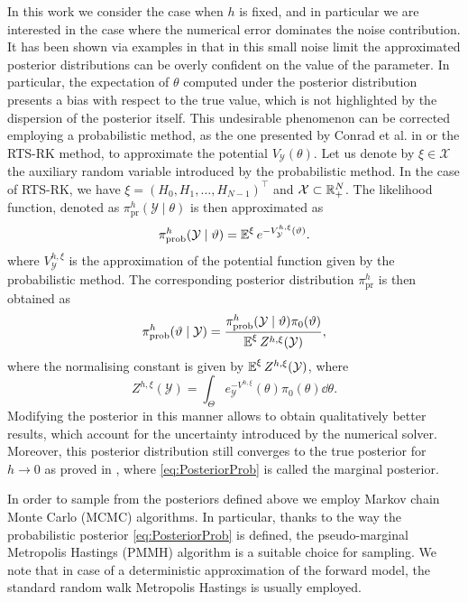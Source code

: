 \documentclass[10pt]{article}
\begin{document}
In this work we consider the case when $h$ is fixed, and in particular we are interested in the case where the numerical error dominates the noise contribution. It has been shown via examples in \cite{CGS16, COS17} that in this small noise limit the approximated posterior distributions can be overly confident on the value of the parameter. In particular, the expectation of $\theta$ computed under the posterior distribution presents a bias with respect to the true value, which is not highlighted by the dispersion of the posterior itself. This undesirable phenomenon can be corrected employing a probabilistic method, as the one presented by Conrad et al. in \cite{CGS16} or the RTS-RK method, to approximate the potential $V_\mathcal{Y}(\theta)$. Let us denote by $\xi \in \mathcal{X}$ the auxiliary random variable introduced by the probabilistic method. In the case of RTS-RK, we have $\xi = (H_0, H_1, \ldots, H_{N-1})^\top$ and $\mathcal{X} \subset \mathbb{R}_+^N$. The likelihood function, denoted as  $\pi^h_{\mathrm{pr}}(\mathcal{Y}\mid\theta)$ is then approximated as 
\begin{equation}\label{eq:LikelihoodProb}
	\pi^h_{\mathrm{prob}}(\mathcal{Y}\mid \vartheta) = \operatorname{\mathbb{E}}^\xi e^{-V^{h,\xi}_{\mathcal{Y}}(\vartheta)}.
\end{equation}
where $V^{h, \xi}_{\mathcal{Y}}$ is the approximation of the potential function given by the probabilistic method. The corresponding posterior distribution $\pi^h_{\mathrm{pr}}$ is then obtained as
\begin{equation}\label{eq:PosteriorProb}
	\pi^h_{\mathrm{prob}}(\vartheta\mid\mathcal{Y}) = \frac{\pi^h_{\mathrm{prob}}(\mathcal{Y}\mid \vartheta)\pi_0(\vartheta)}{\operatorname{\mathbb{E}}^\xi Z^{h, \xi}(\mathcal{Y})},
\end{equation}
where the normalising constant is given by $\operatorname{\mathbb{E}}^\xi Z^{h, \xi}(\mathcal{Y})$, where
\begin{equation}
	Z^{h, \xi}(\mathcal{Y}) = \int_{\Theta} e^{-V^{h,\xi}}_{\mathcal{Y}}(\theta) \pi_0(\theta) \dd \theta.
\end{equation}
Modifying the posterior in this manner allows to obtain qualitatively better results, which account for the uncertainty introduced by the numerical solver. Moreover, this posterior distribution still converges to the true posterior for $h \to 0$ as proved in \cite{LST17}, where \eqref{eq:PosteriorProb} is called the marginal posterior.

In order to sample from the posteriors defined above we employ Markov chain Monte Carlo (MCMC) algorithms. In particular, thanks to the way the probabilistic posterior \eqref{eq:PosteriorProb} is defined, the pseudo-marginal Metropolis Hastings (PMMH) algorithm \cite{AnR09} is a suitable choice for sampling. We note that in case of a deterministic approximation of the forward model, the standard random walk Metropolis Hastings is usually employed.
\end{document}
